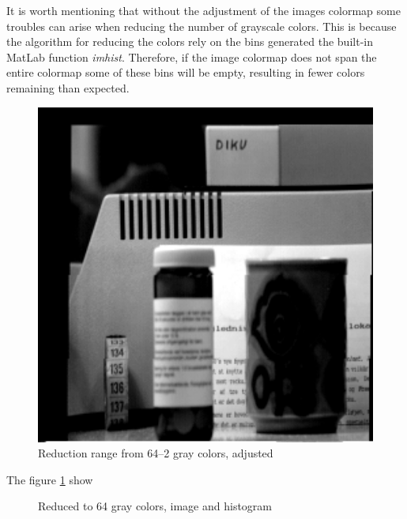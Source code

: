 \documentclass[a4paper, 10pt, final]{article}
\begin{document}
It is worth mentioning that without the adjustment of the images
colormap some troubles can arise when reducing the number of grayscale
colors. This is because the algorithm for reducing the colors rely on
the bins generated the built-in MatLab function
\emph{imhist}. Therefore, if the image colormap does not span the
entire colormap some of these bins will be empty, resulting in fewer
colors remaining than expected.

\begin{figure}[!h]
\centering
\includegraphics[width=1.0\textwidth]{images/img01}
\caption{Reduction range from 64--2 gray colors, adjusted}
\label{fig:reduceGray_range}
\end{figure}
The figure \ref{fig:reduceGray_range} show 

\begin{figure}[!h]
\centering
{}
\caption{Reduced to 64 gray colors, image and histogram}
\label{fig:reduceGray64}
\end{figure}
\end{document}
